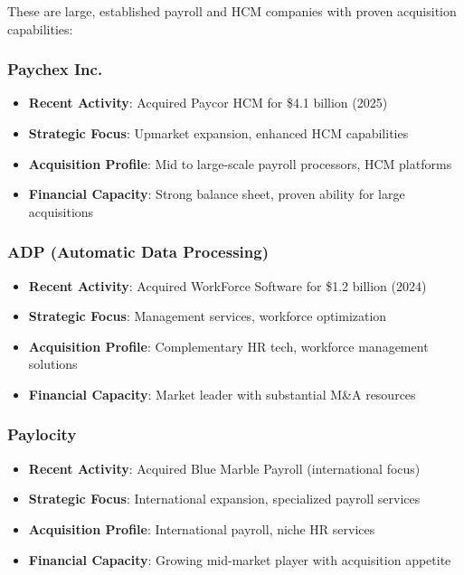 \documentclass[12pt,a4paper]{article}
\begin{document}
These are large, established payroll and HCM companies with proven acquisition capabilities:

\subsubsection{Paychex Inc.}
\begin{itemize}[leftmargin=0.5cm]
    \item \textbf{Recent Activity}: Acquired Paycor HCM for \$4.1 billion (2025)
    \item \textbf{Strategic Focus}: Upmarket expansion, enhanced HCM capabilities
    \item \textbf{Acquisition Profile}: Mid to large-scale payroll processors, HCM platforms
    \item \textbf{Financial Capacity}: Strong balance sheet, proven ability for large acquisitions
\end{itemize}

\subsubsection{ADP (Automatic Data Processing)}
\begin{itemize}[leftmargin=0.5cm]
    \item \textbf{Recent Activity}: Acquired WorkForce Software for \$1.2 billion (2024)
    \item \textbf{Strategic Focus}: Management services, workforce optimization
    \item \textbf{Acquisition Profile}: Complementary HR tech, workforce management solutions
    \item \textbf{Financial Capacity}: Market leader with substantial M\&A resources
\end{itemize}

\subsubsection{Paylocity}
\begin{itemize}[leftmargin=0.5cm]
    \item \textbf{Recent Activity}: Acquired Blue Marble Payroll (international focus)
    \item \textbf{Strategic Focus}: International expansion, specialized payroll services
    \item \textbf{Acquisition Profile}: International payroll, niche HR services
    \item \textbf{Financial Capacity}: Growing mid-market player with acquisition appetite
\end{itemize}
\end{document}
